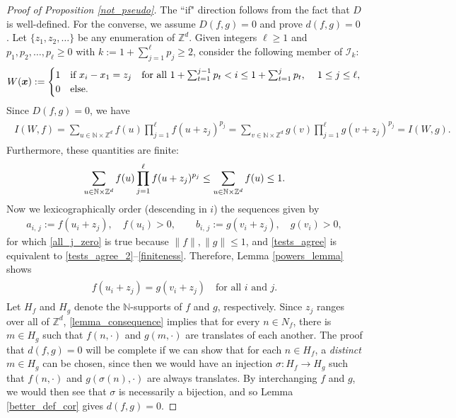 \documentclass[11pt,reqno]{amsart}
\numberwithin{equation}{section}
\theoremstyle{definition}
\begin{document}
\begin{proof}[Proof of Proposition \ref{not_pseudo}]
The ``if" direction follows from the fact that $D$ is well-defined.
For the converse, we assume $D(f,g) = 0$ and prove $d(f,g) = 0$.
Let $\{z_1,z_2,\dots\}$ be any enumeration of ${\mathbb{Z}}^d$.
Given integers $\ell \geq 1$ and $p_1,p_2,\dots,p_\ell \geq 0$ with $k:= 1 + \sum_{j=1}^\ell p_j \geq 2$, consider the following member of ${\mathcal{I}}_k$:
{\begin{align*} {
W({{\boldsymbol {x}}}) := \begin{cases}
1 &\text{if }x_{i} - x_1 = z_j \quad \text{for all $1+\sum_{t = 1}^{j-1} p_t < i \leq 1+ \sum_{t = 1}^{j} p_t$, \quad $1 \leq j \leq \ell$}, \\
0 &\text{else}.
\end{cases}
} \end{align*}}
Since $D(f,g) = 0$, we have
{\begin{align} \begin{split} {
I(W,f) = \sum_{u \in {\mathbb{N}} \times {\mathbb{Z}}^d} f(u) \prod_{j = 1}^\ell f(u+z_j)^{p_j}
= \sum_{v \in {\mathbb{N}} \times {\mathbb{Z}}^d} g(v) \prod_{j = 1}^\ell g(v+z_j)^{p_j}
= I(W,g). \label{tests_agree_2}
} \end{split} \end{align}}
Furthermore, these quantities are finite:
{\begin{align} \begin{split} { \label{finiteness}
\sum_{u \in {\mathbb{N}} \times {\mathbb{Z}}^d} f(u) \prod_{j = 1}^\ell f(u+z_j)^{p_j}
\leq \sum_{u \in {\mathbb{N}} \times {\mathbb{Z}}^d} f(u) \leq 1.
} \end{split} \end{align}}
Now we lexicographically order (descending in $i$) the sequences given by
{\begin{align*} {
a_{i,\, j} := f(u_i+z_j), \quad f(u_i) > 0, \qquad
b_{i,\, j} := g(v_i+z_j), \quad g(v_i) > 0,
} \end{align*}}
for which \eqref{all_j_zero} is true because $\|f\|, \|g\| \leq 1$, and \eqref{tests_agree} is equivalent to \eqref{tests_agree_2}--\eqref{finiteness}.
Therefore, Lemma \ref{powers_lemma} shows
{\begin{align} \begin{split} {
f(u_i+z_j) = g(v_i+z_j) \quad \text{for all $i$ and $j$}. \label{lemma_consequence}
} \end{split} \end{align}}
Let $H_f$ and $H_g$ denote the ${\mathbb{N}}$-supports of $f$ and $g$, respectively.
Since $z_j$ ranges over all of ${\mathbb{Z}}^d$, \eqref{lemma_consequence} implies that for every $n \in N_f$, there is $m \in H_g$ such that $f(n,\cdot)$ and $g(m,\cdot)$ are translates of each another.
The proof that $d(f,g) = 0$ will be complete if we can show that for each $n \in H_f$, a \textit{distinct} $m \in H_g$ can be chosen, since then we would have an injection $\sigma : H_f \to H_g$ such that $f(n,\cdot)$ and $g(\sigma(n),\cdot)$ are always translates.
By interchanging $f$ and $g$, we would then see that $\sigma$ is necessarily a bijection, and so Lemma \ref{better_def_cor} gives $d(f,g) = 0$.


\end{proof}
\end{document}

